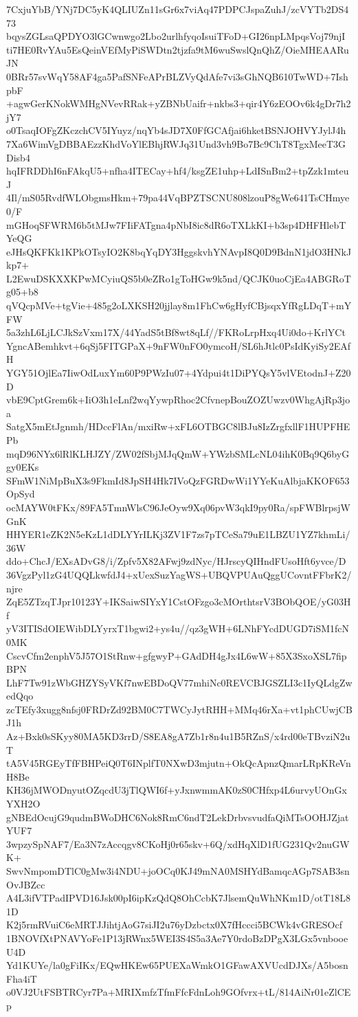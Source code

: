 7CxjuYbB/YNj7DC5yK4QLIUZn11sGr6x7viAq47PDPCJspaZuhJ/zcVYTb2DS473
bqysZGLsaQPDYO3lGCwnwgo2Lbo2urlhfyqoIsuiTFoD+GI26npLMpqsVoj79njI
ti7HE0RvYAu5EsQeinVEfMyPiSWDtn2tjzfa9tM6wuSwslQnQhZ/OieMHEAARuJN
0BRr57svWqY58AF4ga5PafSNFeAPrBLZVyQdAfe7vi3sGhNQB610TwWD+7IshpbF
+agwGerKNokWMHgNVevRRak+yZBNbUaifr+nkbs3+qir4Y6zEOOv6k4gDr7h2jY7
o0TsaqIOFgZKczchCV5IYuyz/nqYb4sJD7X0FfGCAfjai6hketBSNJOHVYJylJ4h
7Xa6WimVgDBBAEzzKhdVoYlEBhjRWJq31Und3vh9Bo7Bc9ChT8TgxMeeT3GDisb4
hqIFRDDhI6nFAkqU5+nfha4ITECay+hf4/ksgZE1uhp+LdISnBm2+tpZzk1mteuJ
4Il/mS05RvdfWLObgmsHkm+79pa44VqBPZTSCNU808lzouP8gWe641TsCHmye0/F
mGHoqSFWRM6b5tMJw7FIiFATgna4pNbI8ic8dR6oTXLkKI+b3sp4DHFHlebTYeQG
eJHsQKFKk1KPkOTsyIO2K8bqYqDY3HggskvhYNAvpI8Q0D9BdnN1jdO3HNkJkp7+
L2EwuDSKXXKPwMCyiuQS5b0eZRo1gToHGw9k5nd/QCJK0uoCjEa4ABGRoTg05+b8
qVQcpMVe+tgVie+485g2oLXKSH20jjlay8m1FhCw6gHyfCBjsqxYfRgLDqT+mYFW
5a3zhL6LjLCJkSzVxm17X/44YadS5tBf8wt8qLf//FKRoLrpHxq4Ui0do+KrlYCt
YgncABemhkvt+6qSj5FITGPaX+9nFW0nFO0ymcoH/SL6hJtlc0PsIdKyiSy2EAfH
YGY51OjlEa7IiwOdLuxYm60P9PWzIu07+4Ydpui4t1DiPYQsY5vlVEtodnJ+Z20D
vbE9CptGrem6k+IiO3h1eLnf2wqYywpRhoc2CfvnepBouZOZUwzv0WhgAjRp3joa
SatgX5mEtJgnmh/HDccFlAn/mxiRw+xFL6OTBGC8lBJu8IzZrgfxllF1HUPFHEPb
mqD96NYx6lRlKLHJZY/ZW02fSbjMJqQmW+YWzbSMLcNL04ihK0Bq9Q6byGgy0EKs
SFmW1NiMpBuX3s9FkmId8JpSH4Hk7IVoQzFGRDwWi1YYeKuAlbjaKKOF653OpSyd
ocMAYW0tFKx/89FA5TmnWlsC96JeOyw9Xq06pvW3qkI9py0Ra/spFWBlrpsjWGnK
HHYER1eZK2N5eKzL1dDLYYrILKj3ZV1F7zs7pTCeSa79uE1LBZU1YZ7khmLi/36W
ddo+ChcJ/EXsADvG8/i/Zpfv5X82AFwj9zdNyc/HJrscyQIHndFUsoHft6yvce/D
36VgzPyl1zG4UQQLkwfdJ4+xUexSuzYagWS+UBQVPUAuQggUCovntFFbrK2/njre
ZqE5ZTzqTJpr10123Y+IKSaiwSIYxY1CstOFzgo3cMOrthtsrV3BObQOE/yG03Hf
yV3ITISdOIEWibDLYyrxT1bgwi2+ys4u//qz3gWH+6LNhFYcdDUGD7iSM1fcN0MK
CscvCfm2enphV5J57O1StRnw+gfgwyP+GAdDH4gJx4L6wW+85X3SxoXSL7fipBPN
LhF7Tw91zWbGHZYSyVKf7nwEBDoQV77mhiNc0REVCBJGSZLI3c1IyQLdgZwedQqo
zcTEfy3xugg8nfsj0FRDrZd92BM0C7TWCyJytRHH+MMq46rXa+vt1phCUwjCBJ1h
Az+Bxk0sSKyy80MA5KD3rrD/S8EA8gA7Zb1r8n4u1B5RZnS/x4rd00eTBvziN2uT
tA5V45RGEyTfFBHPeiQ0T6INplfT0NXwD3mjutn+OkQcApnzQmarLRpKReVnH8Be
KH36jMWODnyutOZqcdU3jTlQWI6f+yJxnwmmAK0zS0CHfxp4L6urvyUOnGxYXH2O
gNBEdOcujG9qudmBWoDHC6Nok8RmC6ndT2LekDrbvsvudfaQiMTsOOHJZjatYUF7
3wpzySpNAF7/Ea3N7zAccqgv8CKoHj0r65skv+6Q/xdHqXlD1fUG231Qv2nuGWK+
SwvNmpomDTlC0gMw3i4NDU+joOCq0KJ49mNA0MSHYdBamqcAGp7SAB3snOvJBZcc
A4L3ifVTPadIPVD16Jsk00pI6ipKzQdQ8OhCcbK7JlsemQuWhNKm1D/otT18L81D
K2j5rmRVuiC6eMRTJJihtjAoG7siJI2u76yDzbctx0X7fHccci5BCWk4vGRESOcf
1BNOVfXtPNAVYoFe1P13jRWnx5WEI3S4S5a3Ae7Y0rdoBzDPgX3LGx5vnbooeU4D
Yd1KUYe/la0gFiIKx/EQwHKEw65PUEXaWmkO1GFawAXVUcdDJXs/A5bosnFha4iT
o0VJ2UtFSBTRCyr7Pa+MRIXmfzTfmFfcFdnLoh9GOfvrx+tL/814AiNr01eZlCEp
